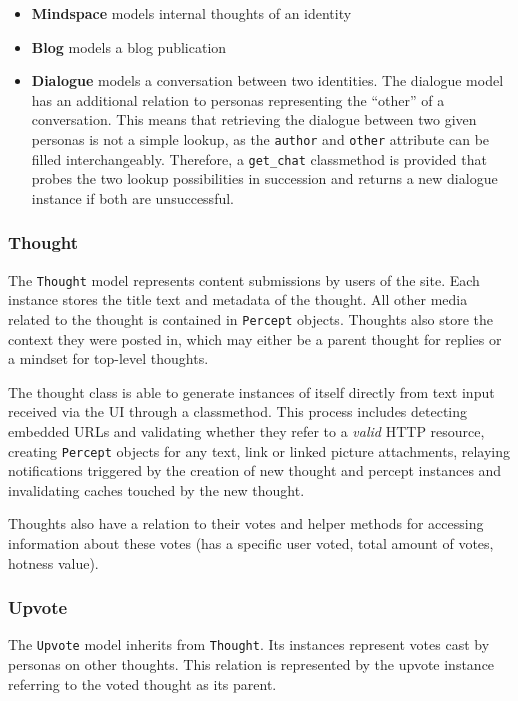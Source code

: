 \begin{itemize}
\tightlist
\item
  \textbf{Mindspace} models internal thoughts of an identity
\item
  \textbf{Blog} models a blog publication
\item
  \textbf{Dialogue} models a conversation between two identities. The
  dialogue model has an additional relation to personas representing the
  ``other'' of a conversation. This means that retrieving the dialogue
  between two given personas is not a simple lookup, as the
  \texttt{author} and \texttt{other} attribute can be filled
  interchangeably. Therefore, a \texttt{get\_chat} classmethod is
  provided that probes the two lookup possibilities in succession and
  returns a new dialogue instance if both are unsuccessful.
\end{itemize}

\subsubsection{Thought}\label{thought}

The \texttt{Thought} model represents content submissions by users of
the site. Each instance stores the title text and metadata of the
thought. All other media related to the thought is contained in
\texttt{Percept} objects. Thoughts also store the context they were
posted in, which may either be a parent thought for replies or a mindset
for top-level thoughts.

The thought class is able to generate instances of itself directly from
text input received via the UI through a classmethod. This process
includes detecting embedded URLs and validating whether they refer to a
\emph{valid} HTTP resource, creating \texttt{Percept} objects for any
text, link or linked picture attachments, relaying notifications
triggered by the creation of new thought and percept instances and
invalidating caches touched by the new thought.

Thoughts also have a relation to their votes and helper methods for
accessing information about these votes (has a specific user voted,
total amount of votes, hotness value).

\subsubsection{Upvote}\label{upvote}

The \texttt{Upvote} model inherits from \texttt{Thought}. Its instances
represent votes cast by personas on other thoughts. This relation is
represented by the upvote instance referring to the voted thought as its
parent.

